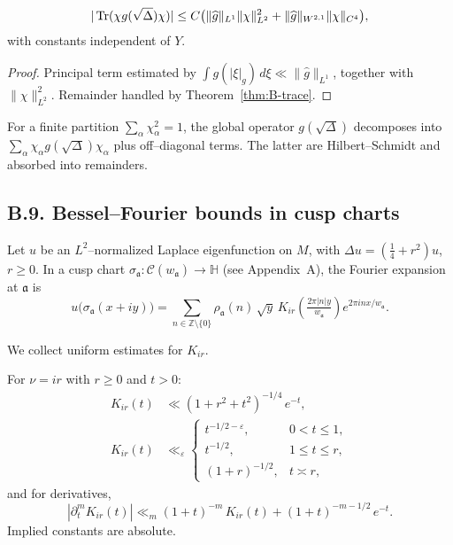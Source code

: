 \begin{corollary}
\label{cor:B-tracebound}
\[
|\operatorname{Tr}(\chi g(\sqrt\Delta)\chi)|
\le C\big(\|\widehat g\|_{L^1}\|\chi\|_{L^2}^2
+ \|\widehat g\|_{W^{2,1}}\|\chi\|_{C^4}\big),
\]
with constants independent of $Y$.
\end{corollary}

\begin{proof}
Principal term estimated by $\int g(|\xi|_g)\,d\xi \ll \|\widehat g\|_{L^1}$,
together with $\|\chi\|_{L^2}^2$. Remainder handled by Theorem~\ref{thm:B-trace}.
\end{proof}

\begin{remark}
\label{rmk:B-glue}
For a finite partition $\sum_\alpha \chi_\alpha^2=1$, the global operator
$g(\sqrt\Delta)$ decomposes into $\sum_\alpha \chi_\alpha g(\sqrt\Delta)\chi_\alpha$
plus off–diagonal terms. The latter are Hilbert–Schmidt and absorbed into remainders.
\end{remark}


\subsection*{B.9. Bessel--Fourier bounds in cusp charts}
\label{subsec:B9-bessel}

Let $u$ be an $L^2$–normalized Laplace eigenfunction on $M$, with
$\Delta u = (\tfrac14 + r^2) u$, $r\ge0$.
In a cusp chart $\sigma_{\mathfrak a}:\mathcal C(w_{\mathfrak a})\to\mathbb H$ (see Appendix~A),
the Fourier expansion at $\mathfrak a$ is
\[
u\!\big(\sigma_{\mathfrak a}(x+iy)\big)
= \sum_{n\in\mathbb Z\setminus\{0\}} \rho_{\mathfrak a}(n)\,
\sqrt{y}\,K_{ir}\!\left(\tfrac{2\pi|n|y}{w_{\mathfrak a}}\right)
e^{2\pi i n x / w_{\mathfrak a}}.
\]

We collect uniform estimates for $K_{ir}$.

\begin{lemma}
\label{lem:B-bessel}
For $\nu=ir$ with $r\ge0$ and $t>0$:
\begin{align}
K_{ir}(t) &\ll (1+r^2+t^2)^{-1/4}\,e^{-t}, \label{eq:B-bessel-large}\\
K_{ir}(t) &\ll_\varepsilon
\begin{cases}
t^{-1/2-\varepsilon}, & 0<t\le1,\\[2pt]
t^{-1/2}, & 1\le t\le r,\\[2pt]
(1+r)^{-1/2}, & t\asymp r,
\end{cases}\label{eq:B-bessel-small}
\end{align}
and for derivatives,
\begin{equation}\label{eq:B-bessel-deriv}
|\partial_t^m K_{ir}(t)| \ll_m (1+t)^{-m}\,K_{ir}(t) + (1+t)^{-m-1/2}\,e^{-t}.
\end{equation}
Implied constants are absolute.
\end{lemma}

